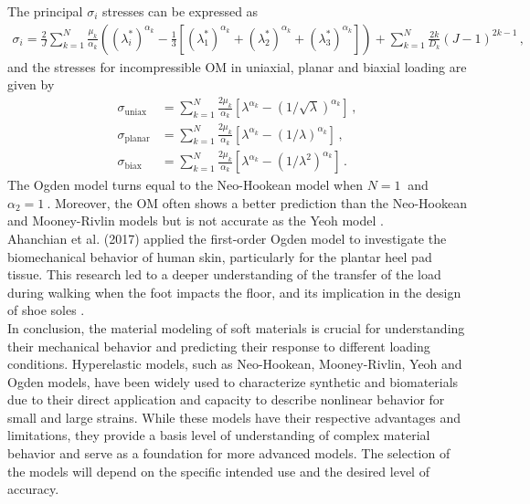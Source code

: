 The principal $\sigma_i$ stresses can be expressed as
\begin{align}
        \sigma_i = \frac{2}{J}\sum_{k=1}^N \frac{\mu_k}{\alpha_k}((\lambda_i^*)^{\alpha_k} - \frac{1}{3}[(\lambda_1^*)^{\alpha_k} + (\lambda_2^*)^{\alpha_k} + (\lambda_3^*)^{\alpha_k}]) + \sum_{k=1}^N \frac{2k}{D_k}(J - 1)^{2k - 1} \,,
\end{align}
and the stresses for incompressible OM in uniaxial, planar and biaxial loading are given by
\begin{align}
        \sigma_{\text{uniax}} &= \sum_{k=1}^N \frac{2\mu_k}{\alpha_k}[\lambda^{\alpha_k} - (1/\sqrt{\lambda})^{\alpha_k}] \,,\\
        \sigma_{\text{planar}} &= \sum_{k=1}^N \frac{2\mu_k}{\alpha_k}[\lambda^{\alpha_k} - (1/\lambda)^{\alpha_k}] \,,\\
        \sigma_{\text{biax}} &= \sum_{k=1}^N \frac{2\mu_k}{\alpha_k}[\lambda^{\alpha_k} - (1/\lambda^2)^{\alpha_k}] \,.
\end{align}
The Ogden model turns equal to the Neo-Hookean model when $N = \SI{1}{}$ and $\alpha_2 = \SI{1}{}$.  
Moreover, the OM often shows a better prediction than the Neo-Hookean and Mooney-Rivlin models but is not accurate as the 
Yeoh model \cite{Bergström2015}.\\

Ahanchian et al. (2017) applied the first-order Ogden model to investigate the biomechanical behavior of 
human skin, particularly for the plantar heel pad tissue. This research led to a deeper understanding of 
the transfer of the load during walking when the foot impacts the floor,
and its implication in the design of shoe soles \cite{Ahanchian2017}.\\

In conclusion, the material modeling of soft materials is crucial for understanding their mechanical 
behavior and predicting their response to different loading conditions. Hyperelastic models, such as 
Neo-Hookean, Mooney-Rivlin, Yeoh and Ogden models, have been widely used to characterize synthetic and biomaterials 
due to their direct application and capacity to describe nonlinear behavior for small and large strains.
While these models have their respective advantages and limitations, they provide a basis level of understanding of 
complex material behavior and serve as a foundation for more advanced models. The selection of the models 
will depend on the specific intended use and the desired level of accuracy. 

